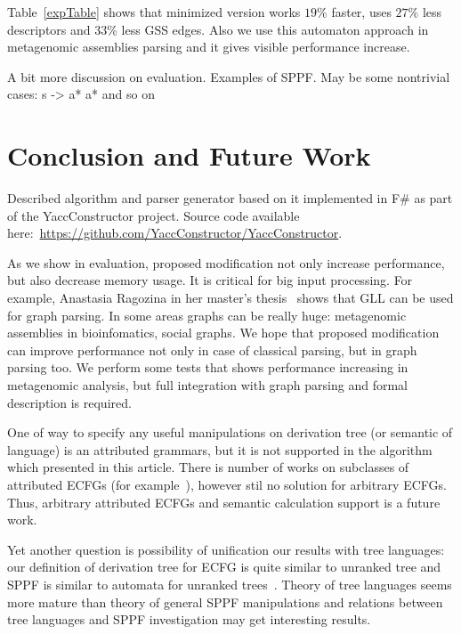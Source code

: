 \documentclass[runningheads,a4paper]{llncs}
\begin{document}
Table~\ref{expTable} shows that minimized version works $19\%$ faster, uses $27\%$ less descriptors and $33\%$ less GSS edges.
Also we use this automaton approach in metagenomic assemblies parsing and it gives visible performance increase.

A bit more discussion on evaluation.
Examples of SPPF.
May be some nontrivial cases: s -> a* a* and so on


\section{Conclusion and Future Work}

Described algorithm and parser generator based on it implemented in F\# as part of the YaccConstructor project.
Source code available here:~\url{https://github.com/YaccConstructor/YaccConstructor}.

As we show in evaluation, proposed modification not only increase performance, but also decrease memory usage. 
It is critical for big input processing.
For example, Anastasia Ragozina in her master's thesis~\cite{ragozina} shows that GLL can be used for graph parsing.  
In some areas graphs can be really huge: metagenomic assemblies in bioinfomatics, social graphs.
We hope that proposed modification can improve performance not only in case of classical parsing, but in graph parsing too. 
We perform some tests that shows performance increasing in metagenomic analysis, but full integration with graph parsing and formal description is required.

One of way to specify any useful manipulations on derivation tree (or semantic of language) is an attributed grammars, but it is not supported in the algorithm which presented in this article.
There is number of works on subclasses of attributed ECFGs (for example~\cite{AttributedELL}), however stil no solution for arbitrary ECFGs.
Thus, arbitrary attributed ECFGs and semantic calculation support is a future work.

Yet another question is possibility of unification our results with tree languages: our definition of derivation tree for ECFG is quite similar to unranked tree and SPPF is similar to automata for unranked trees~\cite{TATA}.
Theory of tree languages seems more mature than theory of general SPPF manipulations and relations between tree languages and SPPF investigation may get interesting results.





\end{document}
